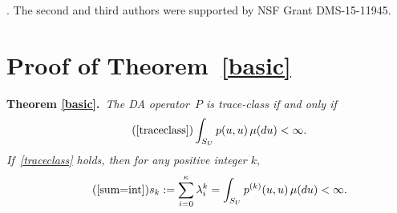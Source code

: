\documentclass[11pt]{article}
\begin{document}
%	
%	
	
	
	
	\vspace*{5mm}
	
	.  The second and third authors were supported by NSF Grant DMS-15-11945.
	
	
	\vspace*{12mm}
	\appendix
	
	\section{Proof of Theorem~\ref{basic}}

	\vspace*{3mm}
	\noindent
	{\bf Theorem \ref{basic}.\,}
	\textit{
		The DA operator~$P$ is trace-class if and only if
		\begin{equation} \tag{\ref{traceclass}}
		\int_{S_U} p(u,u) \, \mu(du) < \infty.
		\end{equation}
		If~\eqref{traceclass} holds, then for any positive integer $k,$
		\begin{equation} \tag{\ref{sum=int}}
		s_k := \sum_{i=0}^{\kappa} \lambda_i^k = \int_{S_U} p^{(k)}(u,u) \, \mu(du) < \infty.
		\end{equation}
		}
		
\end{document}

